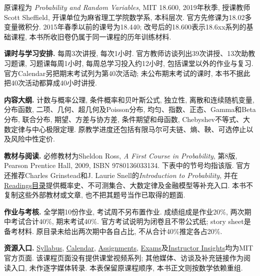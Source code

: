 {}
\par

原课程为 \textit{Probability and Random Variables}, MIT 18.600, 2019年秋季, 授课教师 Scott Sheffield, 开课单位为麻省理工学院数学系, 本科层次. 官方先修课为18.02多变量微积分. 2015年春季以前的课号为18.440; 改号后的18.600表示18.6xx系列的基础课程, 本书所收旧卷仍属于同一课程的历年训练材料.

\noindent\textbf{课时与学习安排.} 每周3次讲授, 每次1小时. 官方教师访谈列出39次讲授、13次助教习题课, 习题课每周1小时, 每周总学习投入约12小时, 包括课堂以外的作业与复习. 官方Calendar另把期末考试列为第40次活动; 未公布期末考试的课时, 本书不据此把40次活动都算成40小时讲授.

\noindent\textbf{内容大纲.} 计数与概率公理, 条件概率和贝叶斯公式, 独立性, 离散和连续随机变量, 分布函数, 二项、几何、超几何及Poisson分布, 均匀、指数、正态、Gamma和Beta分布, 联合分布, 期望、方差与协方差, 条件期望和母函数, Chebyshev不等式、大数定律与中心极限定理. 原教学进度还包括有限马尔可夫链、熵、鞅、可选停止以及风险中性定价.

\noindent\textbf{教材与阅读.} 必修教材为Sheldon Ross, \textit{A First Course in Probability}, 第8版, Pearson Prentice Hall, 2009, ISBN 9780136033134. 下表中的节号均指该版. 官方还推荐Charles Grinstead和J. Laurie Snell的\textit{Introduction to Probability}, 并在\href{https://ocw.mit.edu/courses/18-600-probability-and-random-variables-fall-2019/pages/readings/}{Readings目录}提供概率史、不可测集合、大数定律及金融模型等补充入口. 本书不复制这些外部教材或文章, 也不把其题号当作已取得的题面.

\noindent\textbf{作业与考核.} 全学期10份作业, 考试周不另布置作业. 成绩组成是作业20\%, 两次期中考试合计40\%, 期末考试40\%. 官方考试说明为闭卷且不带公式纸; story sheet是备考材料. 原目录未给出两次期中各自占比, 不从合计40\%推定各占20\%.

\noindent\textbf{资源入口.} \href{https://ocw.mit.edu/courses/18-600-probability-and-random-variables-fall-2019/pages/syllabus/}{Syllabus}, \href{https://ocw.mit.edu/courses/18-600-probability-and-random-variables-fall-2019/pages/calendar/}{Calendar}, \href{https://ocw.mit.edu/courses/18-600-probability-and-random-variables-fall-2019/pages/assignments/}{Assignments}, \href{https://ocw.mit.edu/courses/18-600-probability-and-random-variables-fall-2019/pages/exams/}{Exams}及\href{https://ocw.mit.edu/courses/18-600-probability-and-random-variables-fall-2019/pages/instructor-insights/}{Instructor Insights}均为MIT官方页面. 该课程页面没有提供课堂视频系列; 其他媒体、访谈及补充链接作为阅读入口, 未作逐字媒体转录. 本表保留原课程顺序, 本书正文则按数学依赖重组.

